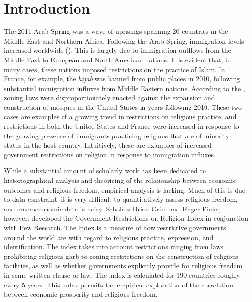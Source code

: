 \documentclass[12pt,english]{article}
\begin{document}
\pagebreak{}

\section{Introduction}
\indent The 2011 Arab Spring was a wave of uprisings spanning 20 countries in the Middle East and Northern Africa. Following the Arab Spring, immigration levels increased worldwide (\citet{MPCreport}). This is largely due to immigration outflows from the Middle East to European and North American nations. It is evident that, in many cases, these nations imposed restrictions on the practice of Islam. In France, for example, the \textit{hijab} was banned from public places in 2010, following substantial immigration influxes from Middle Eastern nations. According to the \citet{ACLU}, zoning laws were disproportionately enacted against the expansion and construction of mosques in the United States in years following 2010. These two cases are examples of a growing trend in restrictions on religious practice, and restrictions in both the United States and France were increased in response to the growing presence of immigrants practicing religions that are of minority status in the host country. Intuitively, these are examples of increased government restrictions on religion in response to immigration influxes.

While a substantial amount of scholarly work has been dedicated to historiographical analysis and theorizing of the relationship between economic outcomes and religious freedom, empirical analysis is lacking. Much of this is due to data constraint--it is very difficult to quantitatively assess religious freedom, and macroeconomic data is noisy. Scholars Brian Grim and Roger Finke, however, developed the Government Restrictions on Religion Index in conjunction with Pew Research. The index is a measure of how restrictive governments around the world are with regard to religious practice, expression, and identification. The index takes into account restrictions ranging from laws prohibiting religious garb to zoning restrictions on the construction of religious facilities, as well as whether governments explicitly provide for religious freedom in some written clause or law. The index is calculated for 190 countries roughly every 5 years. This index permits the empirical exploration of the correlation between economic prosperity and religious freedom.
\end{document}
